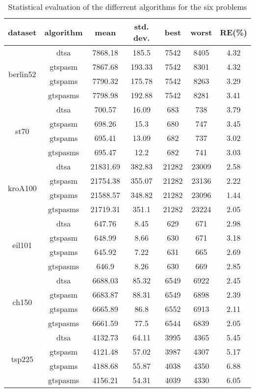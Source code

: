 \begin{table}[ht]
\caption{Statistical evaluation of the differrent algorithms for the six problems}
\begin{center}
\begin{tabular}{|c|c|c|c|c|c|c|}
	\hline
	dataset & algorithm & mean & std. dev. & best & worst & RE(\%)\\
	\hline
	\multirow{4}{*}{berlin52}		& dtsa & 7868.18 & 185.5 & 7542 & 8405 & 4.32\\
		& gtspasm & 7867.68 & 193.33 & 7542 & 8301 & 4.32\\
		& gtspams & 7790.32 & 175.78 & 7542 & 8263 & 3.29\\
		& gtspasms & 7798.98 & 192.88 & 7542 & 8281 & 3.41\\
	\hline
	\multirow{4}{*}{st70}		& dtsa & 700.57 & 16.09 & 683 & 738 & 3.79\\
		& gtspasm & 698.26 & 15.3 & 680 & 747 & 3.45\\
		& gtspams & 695.41 & 13.09 & 682 & 737 & 3.02\\
		& gtspasms & 695.47 & 12.2 & 682 & 741 & 3.03\\
	\hline
	\multirow{4}{*}{kroA100}		& dtsa & 21831.69 & 382.83 & 21282 & 23009 & 2.58\\
		& gtspasm & 21754.38 & 355.07 & 21282 & 23136 & 2.22\\
		& gtspams & 21588.57 & 348.82 & 21282 & 23096 & 1.44\\
		& gtspasms & 21719.31 & 351.1 & 21282 & 23224 & 2.05\\
	\hline
	\multirow{4}{*}{eil101}		& dtsa & 647.76 & 8.45 & 629 & 671 & 2.98\\
		& gtspasm & 648.99 & 8.66 & 630 & 671 & 3.18\\
		& gtspams & 645.92 & 7.22 & 631 & 665 & 2.69\\
		& gtspasms & 646.9 & 8.26 & 630 & 669 & 2.85\\
	\hline
	\multirow{4}{*}{ch150}		& dtsa & 6688.03 & 85.32 & 6549 & 6922 & 2.45\\
		& gtspasm & 6683.87 & 88.31 & 6549 & 6898 & 2.39\\
		& gtspams & 6665.89 & 86.8 & 6552 & 6913 & 2.11\\
		& gtspasms & 6661.59 & 77.5 & 6544 & 6839 & 2.05\\
	\hline
	\multirow{4}{*}{tsp225}		& dtsa & 4132.73 & 64.11 & 3995 & 4365 & 5.45\\
		& gtspasm & 4121.48 & 57.02 & 3987 & 4307 & 5.17\\
		& gtspams & 4188.68 & 55.87 & 4038 & 4350 & 6.88\\
		& gtspasms & 4156.21 & 54.31 & 4039 & 4330 & 6.05\\
	\hline
\end{tabular}
\end{center}
\label{tab:statistical_evaluation}
\end{table}